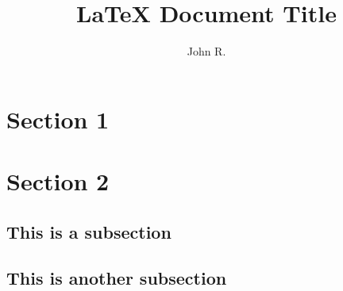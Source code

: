 \documentclass{article}
\author{John R.}
\title{{\LaTeX} Document Title}
\date
\begin{document}
\maketitle

\section{Section 1}

\section{Section 2}

\subsection{This is a subsection}

\subsection{This is another subsection}
\end{document}
